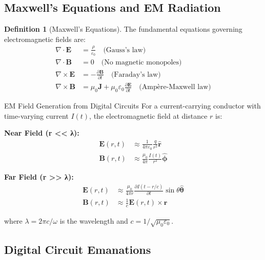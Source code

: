 \documentclass[11pt,a4paper]{article}
\theoremstyle{definition}
\newtheorem{definition}{Definition}[section]
\begin{document}
\subsection{Maxwell's Equations and EM Radiation}

\begin{definition}[Maxwell's Equations]
The fundamental equations governing electromagnetic fields are:
\begin{align}
\nabla \cdot \mathbf{E} &= \frac{\rho}{\varepsilon_0} \quad \text{(Gauss's law)} \\
\nabla \cdot \mathbf{B} &= 0 \quad \text{(No magnetic monopoles)} \\
\nabla \times \mathbf{E} &= -\frac{\partial \mathbf{B}}{\partial t} \quad \text{(Faraday's law)} \\
\nabla \times \mathbf{B} &= \mu_0 \mathbf{J} + \mu_0 \varepsilon_0 \frac{\partial \mathbf{E}}{\partial t} \quad \text{(Ampère-Maxwell law)}
\end{align}
\end{definition}

\begin{mathematicsbox}{EM Field Generation from Digital Circuits}
For a current-carrying conductor with time-varying current $I(t)$, the electromagnetic field at distance $r$ is:

\textbf{Near Field (r << λ):}
\begin{align}
\mathbf{E}(r,t) &\approx \frac{1}{4\pi\varepsilon_0} \frac{q}{r^2} \hat{\mathbf{r}} \\
\mathbf{B}(r,t) &\approx \frac{\mu_0}{4\pi} \frac{I(t)}{r^2} \hat{\boldsymbol{\phi}}
\end{align}

\textbf{Far Field (r >> λ):}
\begin{align}
\mathbf{E}(r,t) &\approx \frac{\mu_0}{4\pi r} \frac{\partial I(t-r/c)}{\partial t} \sin\theta \hat{\boldsymbol{\theta}} \\
\mathbf{B}(r,t) &\approx \frac{1}{c} \mathbf{E}(r,t) \times \hat{\mathbf{r}}
\end{align}

where $\lambda = 2\pi c/\omega$ is the wavelength and $c = 1/\sqrt{\mu_0\varepsilon_0}$.
\end{mathematicsbox}

\subsection{Digital Circuit Emanations}
\end{document}
